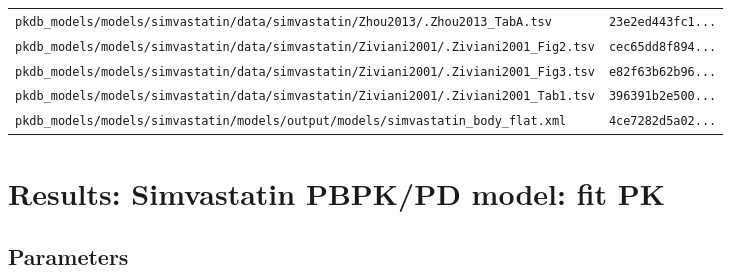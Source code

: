\documentclass{article}
\begin{document}
\begin{longtable}{ll}
\texttt{pkdb\_models/models/simvastatin/data/simvastatin/Zhou2013/.Zhou2013\_TabA.tsv} & \texttt{23e2ed443fc1...} \\
\texttt{pkdb\_models/models/simvastatin/data/simvastatin/Ziviani2001/.Ziviani2001\_Fig2.tsv} & \texttt{cec65dd8f894...} \\
\texttt{pkdb\_models/models/simvastatin/data/simvastatin/Ziviani2001/.Ziviani2001\_Fig3.tsv} & \texttt{e82f63b62b96...} \\
\texttt{pkdb\_models/models/simvastatin/data/simvastatin/Ziviani2001/.Ziviani2001\_Tab1.tsv} & \texttt{396391b2e500...} \\
\texttt{pkdb\_models/models/simvastatin/models/output/models/simvastatin\_body\_flat.xml} & \texttt{4ce7282d5a02...} \\
\end{longtable}

\section{Results: Simvastatin PBPK/PD model: fit PK}

\subsection{Parameters}
\end{document}
